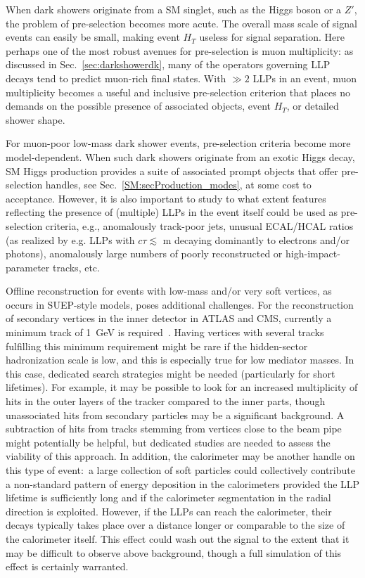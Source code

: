 \begin{enumerate}
When dark showers originate from a SM singlet, such as the Higgs boson or a $Z'$, the problem of pre-selection becomes more acute. The overall mass scale of signal events can easily be small, making event $H_T$ useless for signal separation.   Here perhaps one of the most robust avenues for pre-selection is muon multiplicity: as discussed in Sec.~\ref{sec:darkshowerdk}, many of the operators governing LLP decays tend to predict muon-rich final states.  With $\gg 2$ LLPs in an event, muon multiplicity becomes a useful and inclusive pre-selection criterion that places no demands on the possible presence of associated objects, event $H_T$, or detailed shower shape.

For muon-poor low-mass dark shower events, pre-selection criteria become more model-dependent. When such dark showers originate from an exotic Higgs decay, SM Higgs production provides a suite of associated prompt objects that offer pre-selection handles, see Sec.~\ref{SM:secProduction_modes}, at some  cost to acceptance.   However, it is also important to study to what extent features reflecting the presence of (multiple) LLPs in the event itself could be used as pre-selection criteria, e.g., anomalously track-poor jets, unusual ECAL/HCAL ratios (as realized by e.g. LLPs with $c\tau \lesssim$ m decaying dominantly to electrons and/or photons), anomalously large numbers of poorly reconstructed or high-impact-parameter tracks, etc.

Offline reconstruction for events with low-mass and/or very soft vertices, as occurs in SUEP-style models, poses additional challenges. For the reconstruction of secondary vertices in the inner detector in ATLAS and CMS, currently a minimum track \pt of 1~GeV is required~\cite{Aaboud:2017iio,Chatrchyan:2012jua}. Having vertices with several tracks fulfilling this minimum \pt requirement might be rare if the hidden-sector hadronization scale is low, and this is especially true for low mediator masses. In this case, dedicated search strategies might be needed (particularly for short lifetimes). For example, it may be possible to look for an increased multiplicity of hits in the outer layers of the tracker compared to the inner parts, though unassociated hits from secondary particles may be a significant background. A subtraction of hits from tracks stemming from vertices close to the beam pipe might potentially be helpful, but dedicated studies are needed to assess the viability of this approach.
In addition, the calorimeter may be another handle on this type of event:~a large collection of soft particles could collectively contribute a non-standard  pattern of energy deposition in the calorimeters provided the LLP lifetime is sufficiently long  and if the calorimeter segmentation in the radial direction is exploited. However, if the LLPs can reach the calorimeter, their decays typically takes place over a distance longer or comparable to the size of the calorimeter itself. This effect could wash out the signal to the extent that it may be difficult to observe above background, though a full simulation of this effect is certainly warranted.


\end{enumerate}
